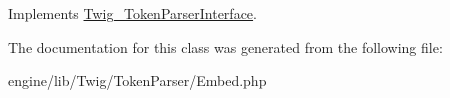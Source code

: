 Implements \hyperlink{interface_twig___token_parser_interface_a5dfa2e269321584fb74e8b43dabe0efd}{Twig\+\_\+\+Token\+Parser\+Interface}.



The documentation for this class was generated from the following file\+:\begin{DoxyCompactItemize}
\item 
engine/lib/\+Twig/\+Token\+Parser/Embed.\+php\end{DoxyCompactItemize}
